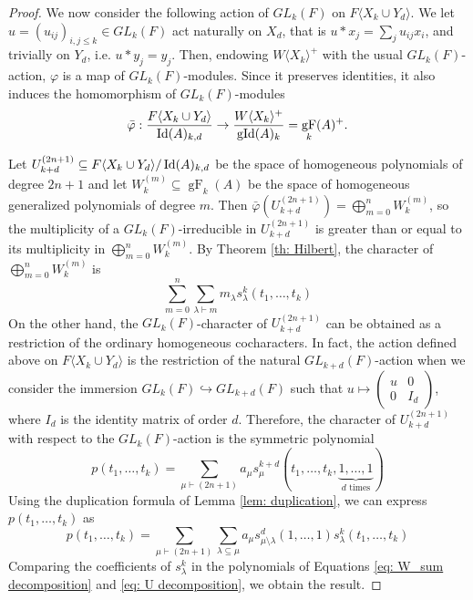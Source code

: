 \documentclass{article}
\DeclareMathOperator{\gid}{\textnormal{gId}}
\DeclareMathOperator{\id}{\textnormal{Id}}
\DeclareMathOperator{\F}{gF}
\begin{document}
\begin{proof}
    We now consider the following action of $GL_k(F)$ on $F\langle X_k\cup Y_d\rangle$. We let $u=(u_{ij})_{i,j\leq k}\in GL_k(F)$ act naturally on $X_d$, that is $u\ast x_j=\sum_ju_{ij}x_i$, and trivially on $Y_d$, i.e. $u *y_j=y_j$. Then, endowing $W\langle X_k\rangle^+$ with the usual $GL_k(F)$-action, $\varphi$ is a map of $GL_k(F)$-modules. Since it preserves identities, it also induces the homomorphism of $GL_k(F)$-modules 
    \[ \bar{\varphi}:\frac{F\langle X_k\cup Y_d\rangle}{\id(A)_{k,d}}\rightarrow \frac{W\langle X_k\rangle^+}{\gid(A)_k}=\F_k(A)^+.\]
    
    Let $U^{(2n+1)}_{k+d}\subseteq F\langle X_k\cup Y_d\rangle/\id(A)_{k,d}$ be the space of homogeneous polynomials of degree $2n+1$ and let $W^{(m)}_k\subseteq\F_k(A)$ be the space of homogeneous generalized polynomials of degree $m$. Then $\bar{\varphi}(U^{(2n+1)}_{k+d})= \bigoplus_{m=0}^n W^{(m)}_k$, so the multiplicity of a $GL_k(F)$-irreducible in $U^{(2n+1)}_{k+d}$ is greater than or equal to its multiplicity in $\bigoplus_{m=0}^n W^{(m)}_k$. By Theorem \ref{th: Hilbert}, the character of $\bigoplus_{m=0}^n W^{(m)}_k$ is \begin{equation}\label{eq: W_sum decomposition}
    	\sum_{m=0}^{n}\sum_{\lambda\vdash m} m_\lambda s^k_\lambda(t_1,\dots,t_k)
    \end{equation}
    On the other hand, the $GL_k(F)$-character of $U^{(2n+1)}_{k+d}$ can be obtained as a restriction of the ordinary homogeneous cocharacters. In fact, the action defined above on $F\langle X_k\cup Y_d\rangle$ is the restriction of the natural $GL_{k+d}(F)$-action when we consider the immersion $GL_k(F)\hookrightarrow GL_{k+d}(F)$ such that $u\mapsto \begin{pmatrix} u & 0 \\ 0 & I_d \end{pmatrix}$, where $I_d$ is the identity matrix of order $d$. Therefore, the character of $U^{(2n+1)}_{k+d}$ with respect to the $GL_k(F)$-action is the symmetric polynomial
    \[ p(t_1,\dots,t_k)=\sum_{\mu\vdash (2n+1)} a_\mu s^{k+d}_\mu (t_1,\dots,t_k,\underbrace{1,\dots,1}_{d\text{ times}}) \]
    Using the duplication formula of Lemma \ref{lem: duplication}, we can express $p(t_1,\dots,t_k)$ as \begin{equation} \label{eq: U decomposition}
    	p(t_1,\dots,t_k)= \sum_{\mu\vdash (2n+1)} \sum_{\lambda\subseteq\mu} a_\mu s^d_{\mu\setminus\lambda} (1,\dots,1) s^k_\lambda (t_1,\dots,t_k)
    \end{equation}
    Comparing the coefficients of $s^k_\lambda$ in the polynomials of Equations \eqref{eq: W_sum decomposition} and \eqref{eq: U decomposition}, we obtain the result.
\end{proof}
\end{document}
